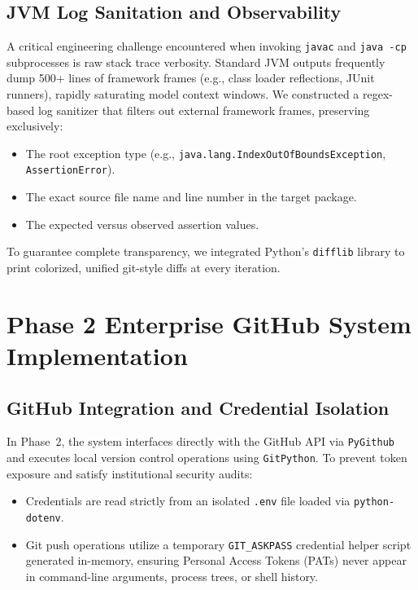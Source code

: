 \documentclass[12pt,a4paper]{report}
\begin{document}
\subsection{JVM Log Sanitation and Observability}
A critical engineering challenge encountered when invoking \texttt{javac} and \texttt{java -cp} subprocesses is raw stack trace verbosity. Standard JVM outputs frequently dump 500+ lines of framework frames (e.g., class loader reflections, JUnit runners), rapidly saturating model context windows. We constructed a regex-based log sanitizer that filters out external framework frames, preserving exclusively:
\begin{itemize}
    \item The root exception type (e.g., \texttt{java.lang.IndexOutOfBoundsException}, \texttt{AssertionError}).
    \item The exact source file name and line number in the target package.
    \item The expected versus observed assertion values.
\end{itemize}
To guarantee complete transparency, we integrated Python's \texttt{difflib} library to print colorized, unified git-style diffs at every iteration.

\section{Phase 2 Enterprise GitHub System Implementation}

\subsection{GitHub Integration and Credential Isolation}
In Phase~2, the system interfaces directly with the GitHub API via \texttt{PyGithub} and executes local version control operations using \texttt{GitPython}. To prevent token exposure and satisfy institutional security audits:
\begin{itemize}
    \item Credentials are read strictly from an isolated \texttt{.env} file loaded via \texttt{python-dotenv}.
    \item Git push operations utilize a temporary \texttt{GIT\_ASKPASS} credential helper script generated in-memory, ensuring Personal Access Tokens (PATs) never appear in command-line arguments, process trees, or shell history.
\end{itemize}
\end{document}
